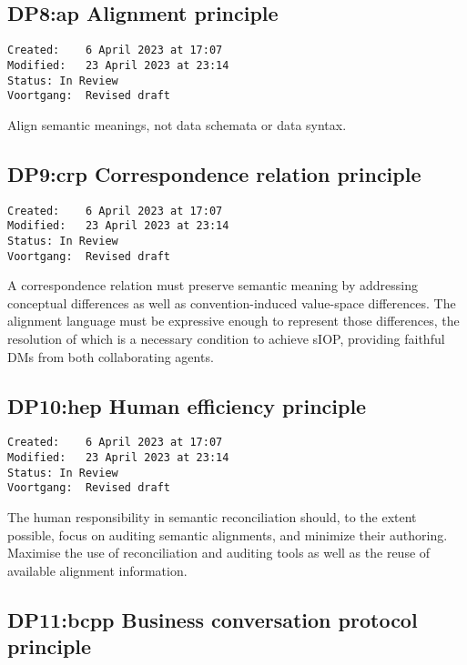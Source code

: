 \documentclass[sort&compress,preprint,3p,authoryear,twocolumn]{elsarticle}
\theoremstyle{break}			%
\begin{document}
\subsection{DP8:ap Alignment principle}\label{dp8ap-alignment-principle}

\begin{verbatim}
Created:    6 April 2023 at 17:07
Modified:   23 April 2023 at 23:14
Status: In Review
Voortgang:  Revised draft
\end{verbatim}

Align semantic meanings, not data schemata or data syntax.

\subsection{DP9:crp Correspondence relation
principle}\label{dp9crp-correspondence-relation-principle}

\begin{verbatim}
Created:    6 April 2023 at 17:07
Modified:   23 April 2023 at 23:14
Status: In Review
Voortgang:  Revised draft
\end{verbatim}

A correspondence relation must preserve semantic meaning by addressing
conceptual differences as well as convention-induced value-space
differences. The alignment language must be expressive enough to
represent those differences, the resolution of which is a necessary
condition to achieve sIOP, providing faithful DMs from both
collaborating agents.

\subsection{DP10:hep Human efficiency
principle}\label{dp10hep-human-efficiency-principle}

\begin{verbatim}
Created:    6 April 2023 at 17:07
Modified:   23 April 2023 at 23:14
Status: In Review
Voortgang:  Revised draft
\end{verbatim}

The human responsibility in semantic reconciliation should, to the
extent possible, focus on auditing semantic alignments, and minimize
their authoring. Maximise the use of reconciliation and auditing tools
as well as the reuse of available alignment information.

\subsection{DP11:bcpp Business conversation protocol
principle}\label{dp11bcpp-business-conversation-protocol-principle}
\end{document}
